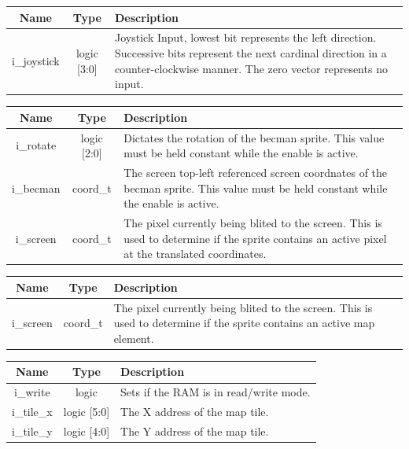 \documentclass[12pt]{article}
\begin{document}
\vspace{0.5in}
\begingroup
{}
\label{tab:input_game_state}
\begin{tabularx}{\linewidth}{ ||c|c|X|| }
    \hline
    Name & Type & Description \\
    \hline
    i\_joystick & logic [3:0] & Joystick Input, lowest bit represents the left
    direction. Successive bits represent the next cardinal direction in a
    counter-clockwise manner. The zero vector represents no input. \\
    \hline
\end{tabularx}
\endgroup

\vspace{0.5in}
\begingroup
{}
\label{tab:input_becman_state}
\begin{tabularx}{\linewidth}{ ||c|c|X|| }
    \hline
    Name & Type & Description \\
    \hline
    i\_rotate & logic [2:0] & Dictates the rotation of the becman sprite. This
    value must be held constant while the enable is active. \\
    i\_becman & coord\_t & The screen top-left referenced screen coordnates of the
    becman sprite. This value must be held constant while the enable is active. \\
    i\_screen & coord\_t & The pixel currently being blited to the screen. This is
    used to determine if the sprite contains an active pixel at the translated
    coordinates. \\
    \hline
\end{tabularx}
\endgroup

\vspace{0.5in}
\begingroup
{}
\label{tab:input_map_sprite}
\begin{tabularx}{\linewidth}{ ||c|c|X|| }
    \hline
    Name & Type & Description \\
    \hline
    i\_screen & coord\_t & The pixel currently being blited to the screen. This is
    used to determine if the sprite contains an active map element. \\
    \hline
\end{tabularx}
\endgroup

\vspace{0.5in}
\begingroup
{}
\label{tab:input_map_ram}
\begin{tabularx}{\linewidth}{ ||c|c|X|| }
    \hline
    Name & Type & Description \\
    \hline
    i\_write & logic & Sets if the RAM is in read/write mode. \\
    i\_tile\_x & logic [5:0] & The X address of the map tile. \\
    i\_tile\_y & logic [4:0] & The Y address of the map tile. \\
    \hline
\end{tabularx}
\endgroup
\end{document}
